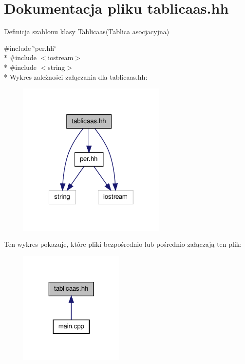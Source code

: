 \hypertarget{tablicaas_8hh}{\section{Dokumentacja pliku tablicaas.\-hh}
\label{tablicaas_8hh}
}


Definicja szablonu klasy Tablicaas(\-Tablica asocjacyjna)  


{\ttfamily \#include \char`\"{}per.\-hh\char`\"{}}\\*
{\ttfamily \#include $<$iostream$>$}\\*
{\ttfamily \#include $<$string$>$}\\*
Wykres zależności załączania dla tablicaas.\-hh\-:\nopagebreak
\begin{figure}[H]
\begin{center}
\leavevmode
\includegraphics[width=209pt]{tablicaas_8hh__incl}
\end{center}
\end{figure}
Ten wykres pokazuje, które pliki bezpośrednio lub pośrednio załączają ten plik\-:\nopagebreak
\begin{figure}[H]
\begin{center}
\leavevmode
\includegraphics[width=148pt]{tablicaas_8hh__dep__incl}
\end{center}
\end{figure}
